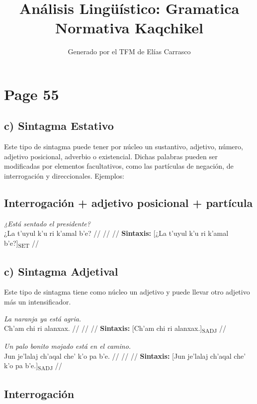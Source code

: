 \documentclass{article}%
\title{Análisis Lingüístico: Gramatica Normativa Kaqchikel}%
\author{Generado por el TFM de Elías Carrasco}%
\begin{document}
%
\normalsize%
\maketitle%
\section{Page 55}%
\label{sec:Page55}%
\subsection{c) Sintagma Estativo}%
\label{subsec:c)SintagmaEstativo}%

%
Este tipo de sintagma puede tener por núcleo un sustantivo, adjetivo, número, adjetivo %
posicional, adverbio o existencial. Dichas palabras pueden ser modificadas por %
elementos facultativos, como las partículas de negación, de interrogación y direccionales. %
Ejemplos: %
\subsection{Interrogación + adjetivo posicional + partícula}%
\label{subsec:Interrogacin+adjetivoposicional+partcula}%

%
\par\medskip%
\ex
\textit{¿Está sentado el presidente?} \\
\begingl
\gla ¿La t’uyul k’u ri k’amal b’e? //
\glb  //
\glc  //
\glft \textbf{Sintaxis:} [¿La t’uyul k’u ri k’amal b’e?]\textsubscript{SET} //
\endgl
\xe
%
\medskip%
\subsection{c) Sintagma Adjetival}%
\label{subsec:c)SintagmaAdjetival}%

%
Este tipo de sintagma tiene como núcleo un adjetivo y puede llevar otro adjetivo más un %
intensificador. %
\par\medskip%
\ex
\textit{La naranja ya está agria.} \\
\begingl
\gla Ch’am chi ri alanxax. //
\glb  //
\glc  //
\glft \textbf{Sintaxis:} [Ch’am chi ri alanxax.]\textsubscript{SADJ} //
\endgl
\xe
%
\medskip%
\par\medskip%
\ex
\textit{Un palo bonito mojado está en el camino.} \\
\begingl
\gla Jun je’lalaj ch’aqal che’ k’o pa b’e. //
\glb  //
\glc  //
\glft \textbf{Sintaxis:} [Jun je’lalaj ch’aqal che’ k’o pa b’e.]\textsubscript{SADJ} //
\endgl
\xe
%
\medskip%
\subsection{Interrogación}%
\label{subsec:Interrogacin}%
\end{document}
